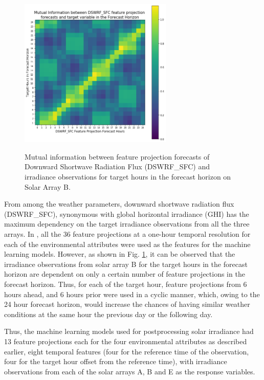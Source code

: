 \begin{figure}[htbp]
    \begin{center}
    	\includegraphics[width=0.65\textwidth]{chapter3/fig_mi_forecast_target.png}
    	\label{fig:fig_mi_forecast_target}
    	\caption[Mutual information between Downward Shortwave Radiation Flux feature projection forecasts and irradiance observations for target hours in the forecast horizon from Solar Array B]{Mutual information between feature projection forecasts of Downward Shortwave Radiation Flux (DSWRF\_SFC) and irradiance observations for target hours in the forecast horizon on Solar Array B.}
    \end{center}
\end{figure}

From among the weather parameters, downward shortwave radiation flux (DSWRF\_SFC), synonymous with global horizontal irradiance (GHI) has the maximum dependency on the target irradiance observations from all the three arrays. In \cite{Zach_Thesis}, all the 36 feature projections at a one-hour temporal resolution for each of the environmental attributes were used as the features for the machine learning models. However, as shown in Fig. \ref{fig:fig_mi_forecast_target}, it can be observed that the irradiance observations from solar array B for the target hours in the forecast horizon are dependent on only a certain number of feature projections in the forecast horizon. Thus, for each of the target hour, feature projections from 6 hours ahead, and 6 hours prior were used in a cyclic manner, which, owing to the 24 hour forecast horizon, would increase the chances of having similar weather conditions at the same hour the previous day or the following day.

Thus, the machine learning models used for postprocessing solar irradiance had 13 feature projections each for the four environmental attributes as described earlier, eight temporal features (four for the reference time of the observation, four for the target hour offset from the reference time), with irradiance observations from each of the solar arrays A, B and E as the response variables. 




